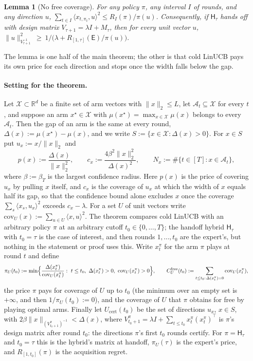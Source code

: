 \documentclass{article}
\newtheorem{lemma}{Lemma}
\theoremstyle{definition}
\theoremstyle{remark}
\newcommand{\R}{\mathbb{R}}
\theoremstyle{remark}
\newcommand{\Exp}{\mathsf{E}}
\newcommand{\Hyb}{\mathsf{H}}
\begin{document}
\begin{lemma}[No free coverage]
\label{lem:no-free-coverage}
For any policy $\pi$, any interval $I$ of rounds, and any direction $u$,
$\sum_{t\in I}\langle x_{t,\pi_t},u\rangle^2\le R_I(\pi)/\pi(u)$.
Consequently, if $\Hyb_\tau$ hands off with design matrix $V_{\tau+1}=\lambda I+M_\tau$, then
for every unit vector $u$,
$\|u\|^2_{V_{\tau+1}^{-1}}\ \ge\ 1\big/\bigl(\lambda+R_{[1,\tau]}(\Exp)/\pi(u)\bigr)$.
\end{lemma}

The lemma is one half of the main theorem; the other is that cold LinUCB
pays its own price for each direction and stops once the width falls below
the gap.

\paragraph{Setting for the theorem.}
Let $\mathcal X\subset\R^d$ be a finite set of arm vectors with
$\|x\|_2\le L$, let $\mathcal A_t\subseteq\mathcal X$ for every $t$, and
suppose an arm $x^\star\in\mathcal X$ with
$\mu(x^\star)=\max_{x\in\mathcal X}\mu(x)$ belongs to every $\mathcal A_t$.
Then the gap of an arm is the same at every round,
$\Delta(x):=\mu(x^\star)-\mu(x)$, and we write
$S:=\{x\in\mathcal X:\Delta(x)>0\}$. For $x\in S$ put $u_x:=x/\|x\|_2$ and
\[
p(x):=\frac{\Delta(x)}{\|x\|_2^2},\qquad
c_x:=\frac{4\beta^2\|x\|_2^2}{\Delta(x)^2},\qquad
N_x:=\#\{t\in[T]:x\in\mathcal A_t\},
\]
where $\beta:=\beta_T$ is the largest confidence radius. Here $p(x)$ is the
price of covering $u_x$ by pulling $x$ itself, and $c_x$ is the coverage of
$u_x$ at which the width of $x$ equals half its gap, so that the confidence
bound alone excludes $x$ once the coverage $\sum_s\langle x_s,u_x\rangle^2$
exceeds $c_x-\lambda$. For a set $U$ of unit vectors write
$\mathrm{cov}_U(x):=\sum_{u\in U}\langle x,u\rangle^2$. The theorem compares
cold LinUCB with an arbitrary policy $\pi$ at an arbitrary cutoff
$t_0\in\{0,\dots,T\}$; the handoff hybrid $\Hyb_\tau$ with $t_0=\tau$ is the
case of interest, and then rounds $1,\dots,t_0$ are the expert's, but nothing
in the statement or proof uses this. Write $x^\pi_t$ for the arm $\pi$ plays
at round $t$ and define
\[
\pi_U(t_0):=\min\Bigl\{\frac{\Delta(x^\pi_t)}{\mathrm{cov}_U(x^\pi_t)}:
\ t\le t_0,\ \Delta(x^\pi_t)>0,\ \mathrm{cov}_U(x^\pi_t)>0\Bigr\},
\qquad
C^{\mathrm{free}}_U(t_0):=\sum_{t\le t_0:\,\Delta(x^\pi_t)=0}\mathrm{cov}_U(x^\pi_t),
\]
the price $\pi$ pays for coverage of $U$ up to $t_0$ (the minimum over an
empty set is $+\infty$, and then $1/\pi_U(t_0):=0$), and the coverage of $U$
that $\pi$ obtains for free by playing optimal arms. Finally let
$U_{\mathrm{cert}}(t_0)$ be the set of directions $u_x$, $x\in S$, with
$2\beta\|x\|_{(V^\pi_{t_0+1})^{-1}}<\Delta(x)$, where
$V^\pi_{t_0+1}=\lambda I+\sum_{t\le t_0}x^\pi_t (x^\pi_t)^\top$ is $\pi$'s design
matrix after round $t_0$: the directions $\pi$'s first $t_0$ rounds certify.
For $\pi=\Hyb_\tau$ and $t_0=\tau$ this is the hybrid's matrix at handoff,
$\pi_U(\tau)$ is the expert's price, and $R_{[1,t_0]}(\pi)$ is the acquisition
regret.
\end{document}
